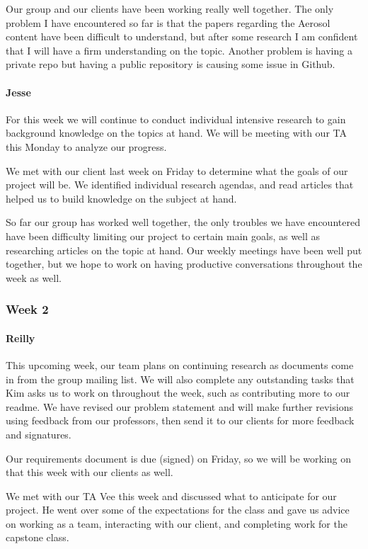 \documentclass[onecolumn, draftclsnofoot,10pt, compsoc]{IEEEtran}
\begin{document}
\begin{flushleft}
 
Our group and our clients have been working really well together. The only problem I have encountered so far is that the papers regarding the Aerosol content have been difficult to understand, but after some research I am confident that I will have a firm understanding on the topic. Another problem is having a private repo but having a public repository is causing some issue in Github.
 
\paragraph{Jesse}
 
For this week we will continue to conduct individual intensive research to gain background knowledge on the topics at hand. We will be meeting with our TA this Monday to analyze our progress.
 
 
We met with our client last week on Friday to determine what the goals of our project will be. We identified individual research agendas, and read articles that helped us to build knowledge on the subject at hand.
 
 
So far our group has worked well together, the only troubles we have encountered have been difficulty limiting our project to certain main goals, as well as researching articles on the topic at hand. Our weekly meetings have been well put together, but we hope to work on having productive conversations throughout the week as well.
 
\subsubsection{Week 2}
\paragraph{Reilly}
 
This upcoming week, our team plans on continuing research as documents come in from the group mailing list. We will also complete any outstanding tasks that Kim asks us to work on throughout the week, such as contributing more to our readme. We have revised our problem statement and will make further revisions using feedback from our professors, then send it to our clients for more feedback and signatures.
 
Our requirements document is due (signed) on Friday, so we will be working on that this week with our clients as well.
 
 
We met with our TA Vee this week and discussed what to anticipate for our project. He went over some of the expectations for the class and gave us advice on working as a team, interacting with our client, and completing work for the capstone class.
 

\end{flushleft}
\end{document}
